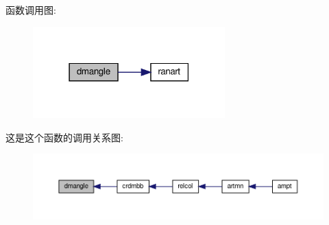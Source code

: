 函数调用图\+:
\nopagebreak
\begin{figure}[H]
\begin{center}
\leavevmode
\includegraphics[width=210pt]{dmangle_8f90_af88cf6281aed01c87573b14561e2dcb6_cgraph}
\end{center}
\end{figure}
这是这个函数的调用关系图\+:
\nopagebreak
\begin{figure}[H]
\begin{center}
\leavevmode
\includegraphics[width=350pt]{dmangle_8f90_af88cf6281aed01c87573b14561e2dcb6_icgraph}
\end{center}
\end{figure}
